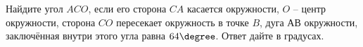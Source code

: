 \begin{ex}
	\begin{condition}
		Найдите угол \( ACO \), если его сторона \( CA \) касается окружности, \( O \) – центр окружности, сторона \( CO \)  пересекает окружность в точке \( B \), дуга \( АВ \)  окружности, заключённая внутри этого угла равна \( 64\degree \). Ответ дайте в градусах.
	\end{condition}
\end{ex}